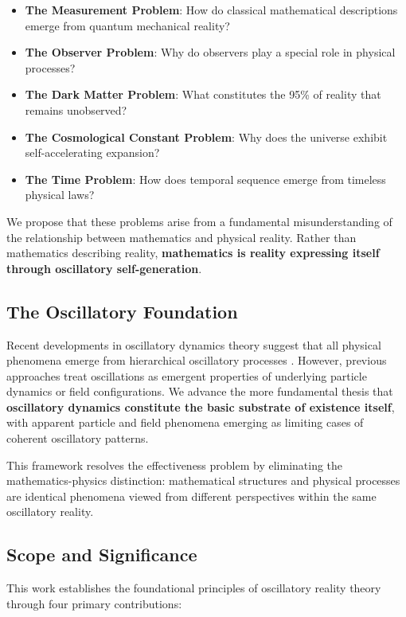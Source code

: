\documentclass[11pt]{article}
\theoremstyle{remark}
\begin{document}
\begin{itemize}
\item \textbf{The Measurement Problem}: How do classical mathematical descriptions emerge from quantum mechanical reality?
\item \textbf{The Observer Problem}: Why do observers play a special role in physical processes?
\item \textbf{The Dark Matter Problem}: What constitutes the 95\% of reality that remains unobserved?
\item \textbf{The Cosmological Constant Problem}: Why does the universe exhibit self-accelerating expansion?
\item \textbf{The Time Problem}: How does temporal sequence emerge from timeless physical laws?
\end{itemize}

We propose that these problems arise from a fundamental misunderstanding of the relationship between mathematics and physical reality. Rather than mathematics describing reality, \textbf{mathematics is reality expressing itself through oscillatory self-generation}.

\subsection{The Oscillatory Foundation}

Recent developments in oscillatory dynamics theory suggest that all physical phenomena emerge from hierarchical oscillatory processes \cite{kuramoto1984chemical,strogatz2018nonlinear}. However, previous approaches treat oscillations as emergent properties of underlying particle dynamics or field configurations. We advance the more fundamental thesis that \textbf{oscillatory dynamics constitute the basic substrate of existence itself}, with apparent particle and field phenomena emerging as limiting cases of coherent oscillatory patterns.

This framework resolves the effectiveness problem by eliminating the mathematics-physics distinction: mathematical structures and physical processes are identical phenomena viewed from different perspectives within the same oscillatory reality.

\subsection{Scope and Significance}

This work establishes the foundational principles of oscillatory reality theory through four primary contributions:
\end{document}
